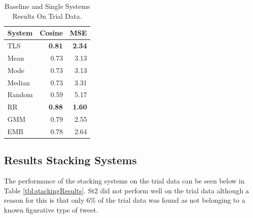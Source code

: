 \documentclass[11pt,letterpaper]{article}
\begin{document}
\begin{table}[!ht]
\begin{center}
\begin{tabular}{|l|r|r|}
\hline
System & Cosine & MSE\\
\hline
TLS & {\bf 0.81} & {\bf 2.34}\\
Mean & 0.73 & 3.13\\
Mode & 0.73 & 3.13\\
Median & 0.73 & 3.31\\
Random & 0.59  & 5.17\\
\hline
{\sc RR} & {\bf 0.88} & {\bf 1.60}\\
GMM & 0.79  & 2.55\\
EMB & 0.78 & 2.64\\
\hline
\end{tabular}
\end{center}
\caption{Baseline and Single Systems Results On Trial Data.}
\label{tbl:baselines}
\end{table}






\subsection{Results Stacking Systems}
The performance of the stacking systems on the trial data can be seen below in Table \ref{tbl:stackingResults}. {\sc St2} did not perform well on the trial data although a reason for this is that only 6\% of the trial data was found as not belonging to a known figurative type of tweet.
\end{document}

